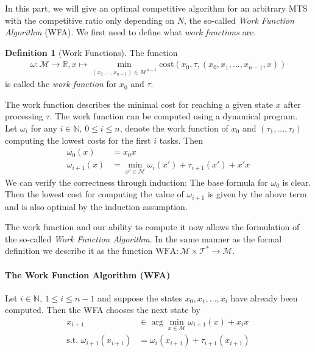 \documentclass[10pt]{amsart}
\theoremstyle{definition}
\newtheorem{definition}{Definition}
\theoremstyle{remark}
\begin{document}
    In this part, we will give an optimal competitive algorithm for an arbitrary MTS with the competitive ratio only depending on \(N\), the so-called \emph{Work Function Algorithm} (WFA). We first need to define what \emph{work functions} are.

    \begin{definition}[Work Functions]
        The function
        \begin{align}
            \omega\colon \mathcal{M} \to \mathbb{R}, x \mapsto \textstyle\min_{(x_1, ..., x_{n-1}) \in \mathcal{M}^{n-1}} \text{cost}(x_0, \tau, (x_0, x_1, ..., x_{n-1}, x))
        \end{align}
        is called the \emph{work function} for \(x_0\) and \(\tau\).
    \end{definition}

    The work function describes the minimal cost for reaching a given state \(x\) after processing \(\tau\). The work function can be computed using a dynamical program. Let \(\omega_i\) for any \(i \in \mathbb{N}\), \(0 \leq i \leq n\), denote the work function of \(x_0\) and \((\tau_1, ..., \tau_i)\) computing the lowest costs for the first \(i\) tasks. Then
    \begin{align}
        \omega_0(x) &= x_0x\\
        \omega_{i+1}(x) &= \min_{x' \in \mathcal{M}} \omega_i(x') + \tau_{i+1}(x') + x'x \label{work_function_comp_dyn_prog_second_stmt}
    \end{align}
    We can verify the correctness through induction: The base formula for \(\omega_0\) is clear. Then the lowest cost for computing the value of \(\omega_{i+1}\) is given by the above term and is also optimal by the induction assumption.

    The work function and our ability to compute it now allows the formulation of the so-called \emph{Work Function Algorithm}. In the same manner as the formal definition we describe it as the function \(\text{WFA}\colon \mathcal{M} \times \mathcal{T}^* \to \mathcal{M}\).

    \phantom{}

    \begin{mdframed}
        \paragraph*{\textbf{The Work Function Algorithm (WFA)}} Let \(i \in \mathbb{N}\), \(1 \leq i \leq n-1\) and suppose the states \(x_0, x_1, ..., x_i\) have already been computed. Then the WFA chooses the next state by
        \begin{align*}
            x_{i+1} &\in \arg\min_{x \in \mathcal{M}} \omega_{i+1}(x)+x_ix \tag{\(\dagger\)} \label{wfa_first_condition}\\
            \text{s.t. } \omega_{i+1}(x_{i+1}) &= \omega_i(x_{i+1})+\tau_{i+1}(x_{i+1}) \tag{\Ankh} \label{wfa_second_condition}
        \end{align*}
    \end{mdframed}
\end{document}
